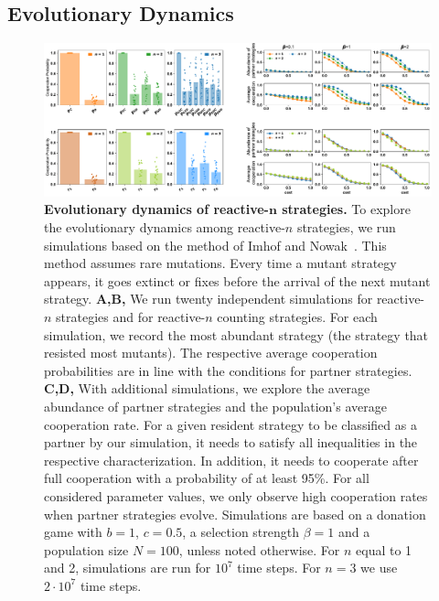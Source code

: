 \documentclass[9pt,twocolumn,twoside]{pnas-new}
\begin{document}

\noindent
\subsection*{Evolutionary Dynamics}

\begin{figure}[tbhp]
       \centering
       \includegraphics[width=\textwidth]{../../figures/abundant_strategies.pdf}
       \caption{\textbf{Evolutionary dynamics of reactive-$\boldsymbol n$ strategies.}
       To explore the evolutionary dynamics among reactive-$n$ strategies, we run simulations based on the
       method of Imhof and Nowak~\cite{imhof:royal:2010}. 
       This method assumes rare mutations. 
       Every time a mutant strategy appears, it goes extinct or fixes before the arrival of the next mutant strategy. 
       {\bf A,B,} We run twenty independent simulations for reactive-$n$ strategies and for reactive-$n$ counting strategies. 
       For each simulation, we record the most abundant strategy (the strategy that resisted most mutants). 
       The respective average cooperation probabilities are in line with the conditions for partner strategies. 
       {\bf C,D,} With additional simulations, we explore the average abundance of partner strategies and the population's average cooperation rate. 
       For a given resident strategy to be classified as a partner by our simulation, it needs to satisfy all inequalities in the respective characterization. 
       In addition, it needs to cooperate after full cooperation with a probability of at least 95\%.  
       For all considered parameter values, we only observe high cooperation rates when partner strategies evolve. 
       Simulations are based on a donation game with \(b\!=\!1\),  \(c\!=\!0.5\), a selection strength $\beta\!=\!1$
       and a population size $N\!=\!100$, unless noted otherwise. For $n$ equal to 1 and 2, simulations are run for \(10 ^ 7\) time steps. For $n\!=\!3$ we use \(2 \!\cdot\!10 ^ 7\) time steps.
       }\label{fig:evolutionary_results}
\end{figure}
\end{document}

